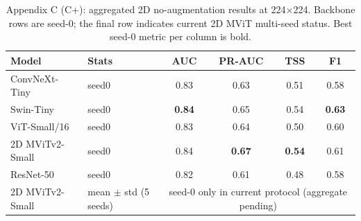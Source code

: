\begin{table}[p]
\centering
\scriptsize
\caption{Appendix C (C+): aggregated 2D no-augmentation results at 224$\times$224. Backbone rows are seed-0; the final row indicates current 2D MViT multi-seed status. Best seed-0 metric per column is bold.}
\label{tab:appC_noaug_cplus}
\begin{tabular}{llcccc}
\toprule
Model & Stats & AUC & PR-AUC & TSS & F1 \\
\midrule
ConvNeXt-Tiny & seed0 & 0.83 & 0.63 & 0.51 & 0.58 \\
Swin-Tiny & seed0 & \textbf{0.84} & 0.65 & 0.54 & \textbf{0.63} \\
ViT-Small/16 & seed0 & 0.83 & 0.64 & 0.50 & 0.60 \\
2D MViTv2-Small & seed0 & 0.84 & \textbf{0.67} & \textbf{0.54} & 0.61 \\
ResNet-50 & seed0 & 0.82 & 0.61 & 0.48 & 0.58 \\
\midrule
2D MViTv2-Small & mean $\pm$ std (5 seeds) & \multicolumn{4}{c}{seed-0 only in current protocol (aggregate pending)} \\
\bottomrule
\end{tabular}
\end{table}
